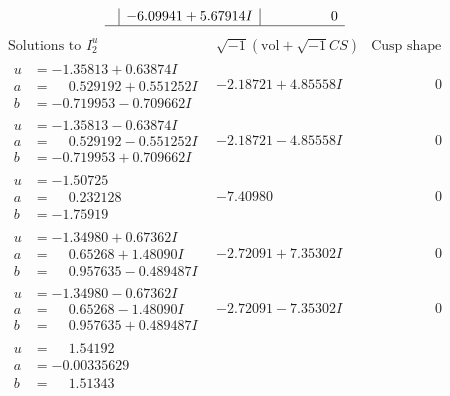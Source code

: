 \documentclass[1p]{elsarticle_modified}
\theoremstyle{definition}
\newcommand{\I}{\sqrt{-1}}
\begin{document}
$$\begin{array}{c|c|c}
 & -6.09941 + 5.67914 I & \phantom{-0.000000 } 0\\
 \hline 
 \end{array}$$\newpage$$\begin{array}{c|c|c}  
\text{Solutions to }I^u_{2}& \I (\text{vol} + \sqrt{-1}CS) & \text{Cusp shape}\\
 \hline 
\begin{aligned}
u &= -1.35813 + 0.63874 I \\
a &= \phantom{-}0.529192 + 0.551252 I \\
b &= -0.719953 - 0.709662 I\end{aligned}
 & -2.18721 + 4.85558 I & \phantom{-0.000000 } 0 \\ \hline\begin{aligned}
u &= -1.35813 - 0.63874 I \\
a &= \phantom{-}0.529192 - 0.551252 I \\
b &= -0.719953 + 0.709662 I\end{aligned}
 & -2.18721 - 4.85558 I & \phantom{-0.000000 } 0 \\ \hline\begin{aligned}
u &= -1.50725\phantom{ +0.000000I} \\
a &= \phantom{-}0.232128\phantom{ +0.000000I} \\
b &= -1.75919\phantom{ +0.000000I}\end{aligned}
 & -7.40980\phantom{ +0.000000I} & \phantom{-0.000000 } 0 \\ \hline\begin{aligned}
u &= -1.34980 + 0.67362 I \\
a &= \phantom{-}0.65268 + 1.48090 I \\
b &= \phantom{-}0.957635 - 0.489487 I\end{aligned}
 & -2.72091 + 7.35302 I & \phantom{-0.000000 } 0 \\ \hline\begin{aligned}
u &= -1.34980 - 0.67362 I \\
a &= \phantom{-}0.65268 - 1.48090 I \\
b &= \phantom{-}0.957635 + 0.489487 I\end{aligned}
 & -2.72091 - 7.35302 I & \phantom{-0.000000 } 0 \\ \hline\begin{aligned}
u &= \phantom{-}1.54192\phantom{ +0.000000I} \\
a &= -0.00335629\phantom{ +0.000000I} \\
b &= \phantom{-}1.51343\phantom{ +0.000000I}\end{aligned}

\end{array}$$
\end{document}
